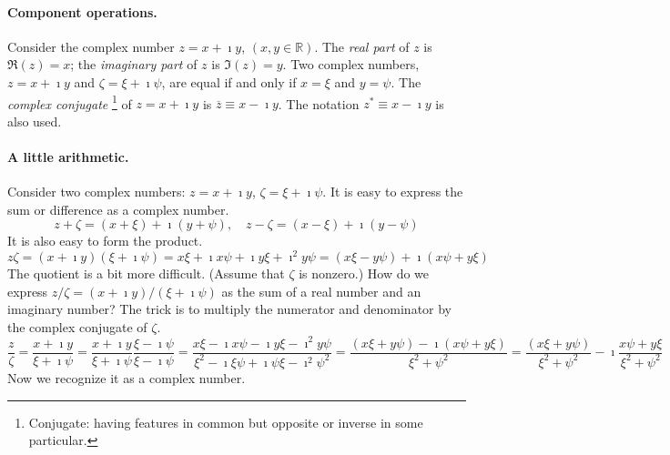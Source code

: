 \paragraph{Component operations.}
Consider the complex number $z = x + \imath y$, $(x,y \in \mathbb{R})$.  
The \textit{real part} of $z$ is 
$\Re(z) = x$; the \textit{imaginary part} of $z$ is $\Im(z) = y$.
Two complex numbers, $z = x + \imath y$ and $\zeta = \xi + \imath \psi$, are equal
if and only if $x = \xi$ and $y = \psi$.  The \textit{complex conjugate}%
\footnote{
  Conjugate: having features in common but opposite or inverse in 
  some particular.
  }
of $z = x + \imath y$ is $\overline{z} \equiv x - \imath y$.  The notation 
$z^* \equiv x - \imath y$ is also used.


\paragraph{A little arithmetic.}
Consider two complex numbers: $z = x + \imath y$, $\zeta = \xi + \imath \psi$.
It is easy to express the sum or difference as a complex number.
\[
z + \zeta = (x + \xi) + \imath(y + \psi), \quad
z - \zeta = (x - \xi) + \imath(y - \psi)
\]
It is also easy to form the product.
\[
z \zeta = (x + \imath y)(\xi + \imath \psi)
= x \xi + \imath x \psi + \imath y \xi + \imath^2 y \psi
= (x \xi - y \psi) + \imath(x \psi + y \xi)
\]
The quotient is a bit more difficult.  (Assume that $\zeta$ is nonzero.)  How do
we express $z / \zeta = (x + \imath y) / (\xi + \imath \psi)$ as the sum of a real
number and an imaginary number?  The trick is to multiply the numerator and
denominator by the complex conjugate of $\zeta$.
\[
\frac{z}{\zeta} 
= \frac{x + \imath y}{\xi + \imath \psi}
= \frac{x + \imath y}{\xi + \imath \psi} \frac{\xi - \imath \psi}{\xi - \imath \psi}
= \frac{x \xi - \imath x \psi - \imath y \xi - \imath^2 y \psi}
{\xi^2 - \imath \xi \psi + \imath \psi \xi - \imath^2 \psi^2}
= \frac{(x \xi + y \psi) - \imath (x \psi + y \xi)}
{\xi^2 + \psi^2}
= \frac{(x \xi + y \psi)}{\xi^2 + \psi^2} - \imath \frac{x \psi + y \xi}{\xi^2 + \psi^2}
\]
Now we recognize it as a complex number.


